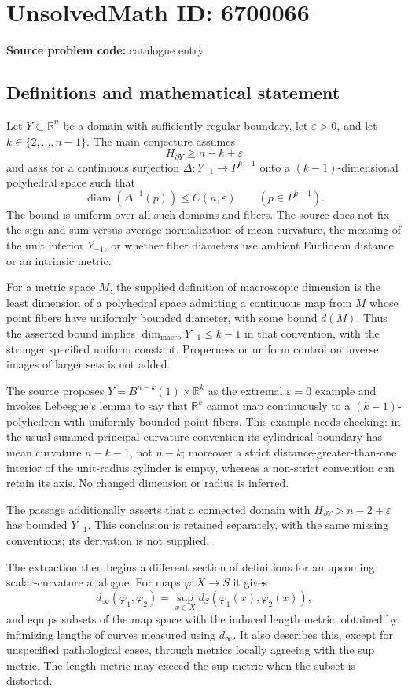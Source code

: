 \documentclass[11pt]{article}
\newcommand{\R}{\mathbb{R}}
\begin{document}
\section*{UnsolvedMath ID: 6700066}
\textbf{Source problem code:} catalogue entry
\subsection{Definitions and mathematical statement}
Let $Y\subset\R^n$ be a domain with sufficiently regular boundary, let $\varepsilon>0$, and let $k\in\{2,\ldots,n-1\}$. The main conjecture assumes
\[
 H_{\partial Y}\ge n-k+\varepsilon
\]
and asks for a continuous surjection $\Delta:Y_{-1}\to P^{k-1}$ onto a $(k-1)$-dimensional polyhedral space such that
\[
 \operatorname{diam}(\Delta^{-1}(p))\le C(n,\varepsilon)
 \qquad(p\in P^{k-1}).
\]
The bound is uniform over all such domains and fibers. The source does not fix the sign and sum-versus-average normalization of mean curvature, the meaning of the unit interior $Y_{-1}$, or whether fiber diameters use ambient Euclidean distance or an intrinsic metric.

For a metric space $M$, the supplied definition of macroscopic dimension is the least dimension of a polyhedral space admitting a continuous map from $M$ whose point fibers have uniformly bounded diameter, with some bound $d(M)$. Thus the asserted bound implies $\operatorname{dim}_{\mathrm{macro}}Y_{-1}\le k-1$ in that convention, with the stronger specified uniform constant. Properness or uniform control on inverse images of larger sets is not added.

The source proposes $Y=B^{n-k}(1)\times\R^k$ as the extremal $\varepsilon=0$ example and invokes Lebesgue's lemma to say that $\R^k$ cannot map continuously to a $(k-1)$-polyhedron with uniformly bounded point fibers. This example needs checking: in the usual summed-principal-curvature convention its cylindrical boundary has mean curvature $n-k-1$, not $n-k$; moreover a strict distance-greater-than-one interior of the unit-radius cylinder is empty, whereas a non-strict convention can retain its axis. No changed dimension or radius is inferred.

The passage additionally asserts that a connected domain with $H_{\partial Y}>n-2+\varepsilon$ has bounded $Y_{-1}$. This conclusion is retained separately, with the same missing conventions; its derivation is not supplied.

The extraction then begins a different section of definitions for an upcoming scalar-curvature analogue. For maps $\varphi:X\to S$ it gives
\[
 d_\infty(\varphi_1,\varphi_2)
       =\sup_{x\in X}d_S(\varphi_1(x),\varphi_2(x)),
\]
and equips subsets of the map space with the induced length metric, obtained by infimizing lengths of curves measured using $d_\infty$. It also describes this, except for unspecified pathological cases, through metrics locally agreeing with the sup metric. The length metric may exceed the sup metric when the subset is distorted.
\end{document}
